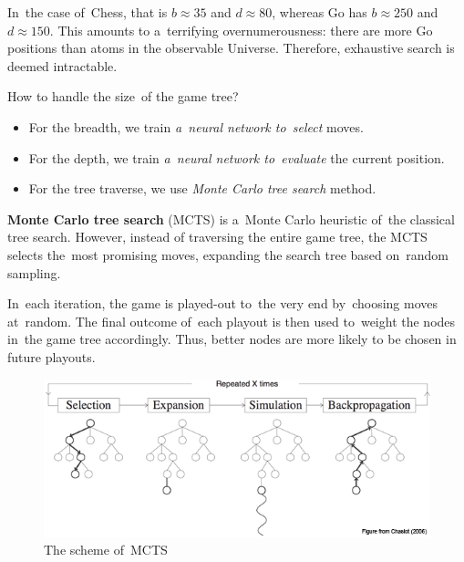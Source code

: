 In~the case of~Chess, that is $b \approx 35$ and $d \approx 80$, whereas Go has $b \approx 250$ and $d \approx 150$.
This amounts to a~terrifying overnumerousness: there are more Go positions than atoms in the observable Universe.
Therefore, exhaustive search is deemed intractable.

How to handle the size~of the game tree?
\begin{itemize}
  \item For the breadth, we train \emph{a~neural network to~select} moves.
  \item For the depth, we train \emph{a~neural network to~evaluate} the current position.
  \item For the tree traverse, we use \emph{Monte Carlo tree search} method.
\end{itemize}

\textbf{Monte Carlo tree search} (MCTS) is a~Monte Carlo heuristic of~the classical tree search.
However, instead of traversing the entire game tree, the MCTS selects the~most promising moves, expanding the search tree based on~random sampling.

In~each iteration, the game is played-out to~the very end by~choosing moves at~random.
The final outcome of~each playout is then used to~weight the nodes in~the game tree accordingly.
Thus, better nodes are more likely to be chosen in future playouts.

\begin{figure}[H]
  \centering
  \includegraphics[width=.6\textwidth]{../img/MCTS.png}
  \caption{The scheme of~MCTS}
  \label{fig:MCTS}
\end{figure}

